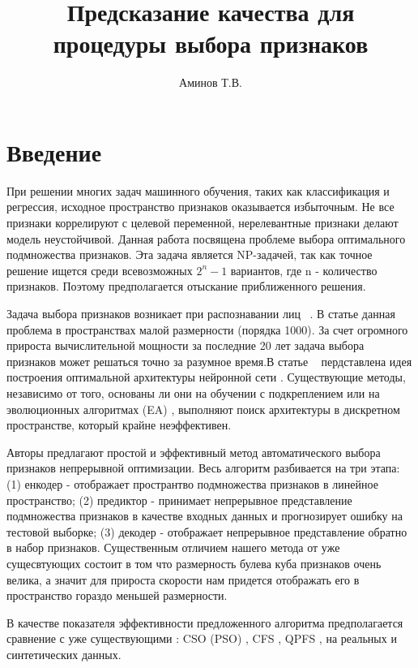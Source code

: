 \documentclass[12pt,twoside]{article}
\title
    [Предсказание качества для процедуры выбора признаков] %
    {Предсказание качества для процедуры выбора признаков}
\author
    [Аминов Т.В.] %
    {Аминов Т.В.} %
    [Аминов Т.В.] %
\begin{document}
\maketitle
\section{Введение}
При решении многих задач машинного обучения, таких как классификация и регрессия, исходное пространство признаков оказывается избыточным. Не все признаки коррелируют с целевой переменной, нерелевантные признаки делают модель неустойчивой. Данная работа посвящена проблеме выбора оптимального подмножества признаков. Эта задача является NP-задачей, так как точное решение ищется среди всевозможных $2^n - 1$ вариантов, где n - количество признаков. Поэтому предполагается отыскание приближенного решения.

Задача выбора признаков возникает при  распознавании лиц  ~\cite{inproceedings}. В статье \cite{bertsimas2016} данная проблема в пространствах малой размерности (порядка 1000). За счет огромного прироста вычислительной мощности за последние 20 лет задача выбора признаков может решаться точно за разумное время.В статье ~\cite{cao2018learnable} пердставлена идея построения оптимальной архитектуры нейронной сети . Существующие методы, независимо от того, основаны ли они на обучении с подкреплением \cite{article2} или на эволюционных алгоритмах (EA) \cite{5989810}, выполняют поиск архитектуры в дискретном пространстве, который крайне неэффективен.

 Авторы предлагают простой и эффективный метод автоматического выбора признаков непрерывной оптимизации. Весь алгоритм разбивается на три этапа: (1) енкодер - отображает пространтво подмножества признаков в линейное пространство; (2) предиктор - принимает непрерывное представление подмножества признаков  в качестве входных данных и прогнозирует ошибку на тестовой выборке; (3) декодер - отображает непрерывное представление обратно в набор признаков. Существенным отличием нашего метода от уже сущесвтующих состоит в том что размерность булева куба признаков очень велика, а значит для прироста скорости нам придется отображать его в пространство гораздо меньшей размерности.


В качестве показателя эффективности предложенного алгоритма предполагается сравнение с уже существующими : CSO (PSO) \cite{article}, CFS \cite{Gu2018}, QPFS \cite{Rodriguez-Lujan:2010:QPF:1756006.1859900}, на реальных и синтетических данных.
\end{document}
